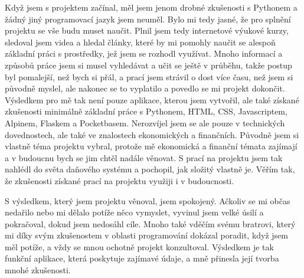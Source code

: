 \documentclass[11pt,a4paper,twoside,openright]{report}
\let\openright=\cleardoublepage
\begin{document}
Když jsem s projektem začínal, měl jsem jenom drobné zkušenosti s Pythonem a žádný jiný
programovací jazyk jsem neuměl. Bylo mi tedy jasné, že pro splnění projektu se vše budu muset
naučit.  Plnil jsem tedy internetové výukové kurzy, sledoval jsem videa a hledal články,
které by mi pomohly naučit se alespoň základní práci s prostředky, jež jsem se rozhodl využívat.
Mnoho informací a způsobů práce jsem si musel vyhledávat a učit se ještě v průběhu, takže
postup byl pomalejší, než bych si přál, a prací jsem strávil o dost více času, než jsem
si původně myslel, ale nakonec se to vyplatilo a povedlo se mi projekt dokončit. Výsledkem
pro mě tak není pouze aplikace, kterou jsem vytvořil, ale také získané zkušenosti minimálně
základní práce s Pythonem, HTML, CSS, Javascriptem, Alpinem, Flaskem a Pocketbasem. Nerozvíjel
jsem se ale pouze v technických dovednostech, ale také ve znalostech ekonomických a finančních.
Původně jsem si vlastně téma projektu vybral, protože mě ekonomická a finanční témata zajímají
a v budoucnu bych se jim chtěl nadále věnovat. S prací na projektu jsem tak nahlédl do světa
daňového systému a pochopil, jak složitý vlastně je. Věřím tak, že zkušenosti získané prací
na projektu využiji i v budoucnosti.

S výsledkem, který jsem projektu věnoval, jsem spokojený. Ačkoliv se mi občas nedařilo nebo mi
dělalo potíže něco vymyslet, vyvinul jsem velké úsilí a pokračoval, dokud jsem nedosáhl cíle.
Mnoho také vděčím svému bratrovi, který mi díky svým zkušenostem v oblasti programování dokázal
poradit, když jsem měl potíže, a vždy se mnou ochotně projekt konzultoval. Výsledkem je tak
funkční aplikace, která poskytuje zajímavé údaje, a mně přinesla její tvorba mnohé zkušenosti.

\printbibliography[title={Seznam použité literatury},heading={bibintoc}]

\openright
\listoffigures
{}

\clearpage
\listoftables
{}


\end{document}
